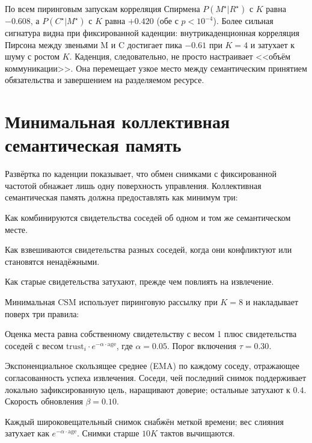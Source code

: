 \documentclass{article}
\begin{document}
По всем пиринговым запускам корреляция Спирмена $P(M^\star|R^\star)$ с
$K$ равна $-0.608$, а $P(C^\star|M^\star)$ с $K$ равна $+0.420$ (обе с
$p<10^{-4}$). Более сильная сигнатура видна при фиксированной каденции:
внутрикаденционная корреляция Пирсона между звеньями M и C достигает
пика $-0.61$ при $K{=}4$ и затухает к шуму с ростом $K$. Каденция,
следовательно, не просто настраивает <<объём коммуникации>>. Она
перемещает узкое место между семантическим принятием обязательства и
завершением на разделяемом ресурсе.

\section{Минимальная коллективная семантическая память}
\label{p4:sec:csm}

Развёртка по каденции показывает, что обмен снимками с фиксированной
частотой обнажает лишь одну поверхность управления. Коллективная
семантическая память должна предоставлять как минимум три:
\begin{description}[leftmargin=14pt,itemsep=1pt,topsep=2pt]
\item[Слияние.] Как комбинируются свидетельства соседей об одном и том же семантическом месте.
\item[Доверие.] Как взвешиваются свидетельства разных соседей, когда они конфликтуют или становятся ненадёжными.
\item[Устаревание.] Как старые свидетельства затухают, прежде чем повлиять на извлечение.
\end{description}

Минимальная CSM использует пиринговую рассылку при $K{=}8$ и
накладывает поверх три правила:
\begin{description}[leftmargin=14pt,itemsep=1pt,topsep=2pt]
\item[\textit{Слияние.}] Оценка места равна собственному свидетельству с весом 1 плюс свидетельства соседей с весом $\mathrm{trust}_i \cdot e^{-\alpha \cdot \mathrm{age}}$, где $\alpha=0.05$. Порог включения $\tau=0.30$.
\item[\textit{Доверие.}] Экспоненциальное скользящее среднее (EMA) по каждому соседу, отражающее согласованность успеха извлечения. Соседи, чей последний снимок поддерживает локально зафиксированную цель, наращивают доверие; остальные затухают к $0.4$. Скорость обновления $\beta=0.10$.
\item[\textit{Устаревание.}] Каждый широковещательный снимок снабжён меткой времени; вес слияния затухает как $e^{-\alpha\cdot\mathrm{age}}$. Снимки старше $10K$ тактов вычищаются.
\end{description}
\end{document}
